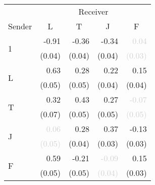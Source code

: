 \begin{tabular}{lrrrr}
\toprule
& \multicolumn{4}{c}{Receiver} \\
\cmidrule(l){2-5} 
Sender & \multicolumn{1}{c}{L} & \multicolumn{1}{c}{T} & \multicolumn{1}{c}{J} & \multicolumn{1}{c}{F} \\
\midrule
\multirow{2}{*}{1} &-0.91 &-0.36 &-0.34 &\textcolor{LightGray}{0.04}\\
 &\tiny{(0.04)} &\tiny{(0.04)} &\tiny{(0.04)} &\textcolor{LightGray}{\tiny{(0.03)}}\\[1ex]
\multirow{2}{*}{L} &\cellcolor{Gray}0.63 &0.28 &0.22 &0.15\\
 &\cellcolor{Gray}\tiny{(0.05)} &\tiny{(0.05)} &\tiny{(0.04)} &\tiny{(0.04)}\\[1ex]
\multirow{2}{*}{T} &0.32 &\cellcolor{Gray}0.43 &0.27 &\textcolor{LightGray}{-0.07}\\
 &\tiny{(0.07)} &\cellcolor{Gray}\tiny{(0.05)} &\tiny{(0.05)} &\textcolor{LightGray}{\tiny{(0.05)}}\\[1ex]
\multirow{2}{*}{J} &\textcolor{LightGray}{0.06} &0.28 &\cellcolor{Gray}0.37 &-0.13\\
 &\textcolor{LightGray}{\tiny{(0.05)}} &\tiny{(0.04)} &\cellcolor{Gray}\tiny{(0.03)} &\tiny{(0.03)}\\[1ex]
\multirow{2}{*}{F} &0.59 &-0.21 &\textcolor{LightGray}{-0.09} &\cellcolor{Gray}0.15\\
 &\tiny{(0.05)} &\tiny{(0.05)} &\textcolor{LightGray}{\tiny{(0.04)}} &\cellcolor{Gray}\tiny{(0.03)}\\[1ex]
\bottomrule
\end{tabular}
